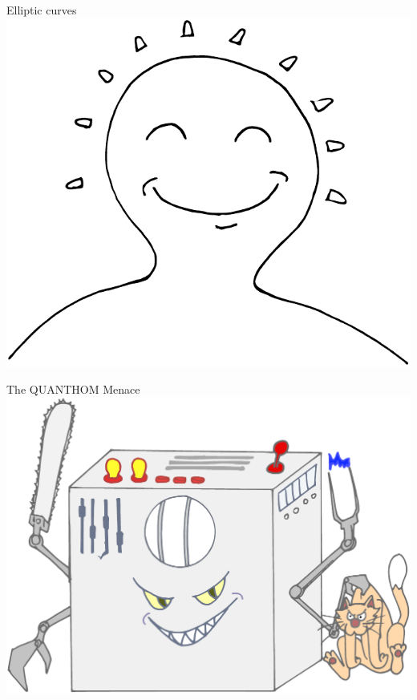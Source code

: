 \documentclass{beamer}
\begin{document}
\begin{frame}{Elliptic curves}
  \transdissolve
  \centering
  \includegraphics[height=0.7\textheight]{ec-happy}
\end{frame}


\begin{frame}{The QUANTHOM Menace}
  \centering
  \includegraphics[height=0.7\textheight]{qc-color}
\end{frame}

\end{document}
